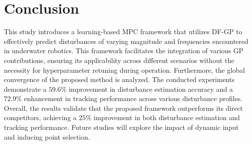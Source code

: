 









\section{Conclusion}
\label{sec:conclusion}

This study introduces a learning-based \ac{MPC} framework that utilizes \ac{DF-GP} to effectively predict disturbances of varying magnitude and frequencies encountered in underwater robotics. This framework facilitates the integration of various \ac{GP} contributions, ensuring its applicability across different scenarios without the necessity for hyperparameter retuning during operation. Furthermore, the global convergence of the proposed method is analyzed. The conducted experiments demonstrate a \(59.6\%\) improvement in disturbance estimation accuracy and a \(72.9\%\) enhancement in tracking performance across various disturbance profiles. Overall, the results validate that the proposed framework outperforms its direct competitors, achieving a \(25\%\) improvement in both disturbance estimation and tracking performance. Future studies will explore the impact of dynamic input and inducing point selection. %

